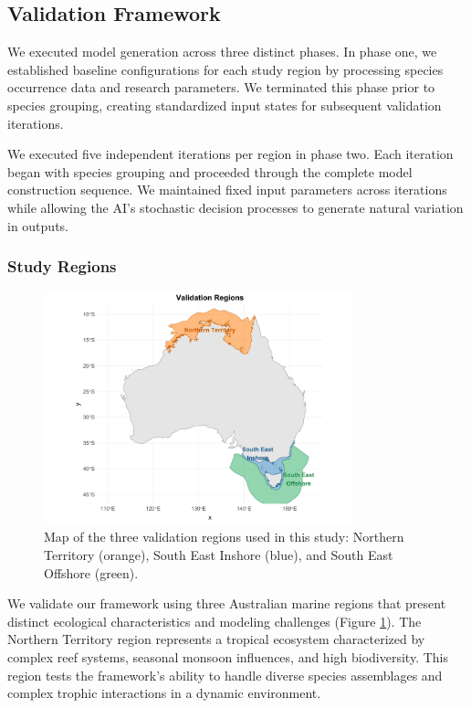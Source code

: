 \subsection{Validation Framework}

We executed model generation across three distinct phases. In phase one, we established baseline configurations for each study region by processing species occurrence data and research parameters. We terminated this phase prior to species grouping, creating standardized input states for subsequent validation iterations.

We executed five independent iterations per region in phase two. Each iteration began with species grouping and proceeded through the complete model construction sequence. We maintained fixed input parameters across iterations while allowing the AI's stochastic decision processes to generate natural variation in outputs.

\subsubsection{Study Regions}

\begin{figure}[htbp]
    \centering
    \includegraphics[width=0.8\textwidth]{figures/validation_regions.pdf}
    \caption{Map of the three validation regions used in this study: Northern Territory (orange), South East Inshore (blue), and South East Offshore (green).}
    \label{fig:validation_regions}
    \end{figure}

We validate our framework using three Australian marine regions that present distinct ecological characteristics and modeling challenges (Figure \ref{fig:validation_regions}). The Northern Territory region represents a tropical ecosystem characterized by complex reef systems, seasonal monsoon influences, and high biodiversity. This region tests the framework's ability to handle diverse species assemblages and complex trophic interactions in a dynamic environment.

